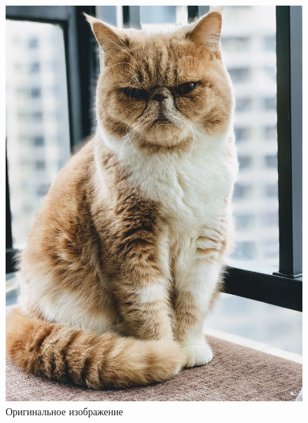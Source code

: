 \begin{figure}[H]
    \centering
    \includegraphics[width=\textwidth]{figures/originalCat.jpg}
    \caption{Оригинальное изображение}
    \label{fig:original}
\end{figure}

